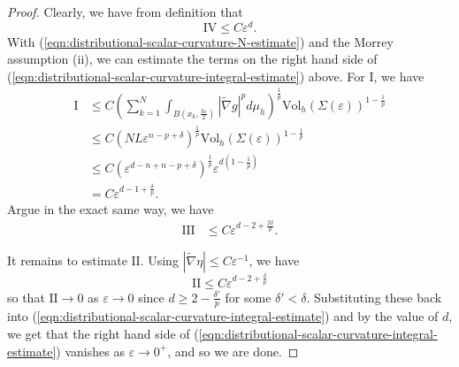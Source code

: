 \documentclass[12pt]{amsart}
\newcommand{\hdel}{\tilde{\nabla}}
\theoremstyle{remark}
\numberwithin{equation}{section}
\def\e{\varepsilon}
\begin{document}
\begin{proof}
Clearly, we have from definition that
 \begin{equation*}
        \text{IV} \leq C\varepsilon^d.
    \end{equation*}
    With (\ref{eqn:distributional-scalar-curvature-N-estimate}) and the Morrey assumption (ii), we can estimate the terms on the right hand side of (\ref{eqn:distributional-scalar-curvature-integral-estimate}) above. For I, we have
    \begin{align*}
        \text{I} &\leq C\left(\sum\limits_{k=1}^N \int_{B(x_k,\frac{3\varepsilon}{2})}|\hdel g|^pd\mu_h\right)^\frac{1}{p}\text{Vol}_h(\Sigma(\varepsilon))^{1-\frac{1}{p}} \nonumber \\
        &\leq C\left(NL\varepsilon^{n-p+\delta}\right)^\frac{1}{p}\text{Vol}_h(\Sigma(\varepsilon))^{1-\frac{1}{p}} \nonumber \\
        &\leq C(\varepsilon^{d-n+n-p+\delta})^\frac{1}{p}\varepsilon^{d\left(1-\frac{1}{p}\right)} \nonumber \\
        &= C\varepsilon^{d-1+\frac{\delta}{p}}.
    \end{align*} 
Argue in the exact same way, we have 
    \begin{align*}
        \text{III} &\leq C\varepsilon^{d-2+\frac{2\delta}{p}}.
    \end{align*}
    
%    

It remains to estimate $\text{II}$. Using $|\hdel \eta|\leq C\e^{-1}$, we have 
\begin{equation}
\text{II}\leq C\e^{d-2+\frac{\delta}{p}}
\end{equation}
so that $\text{II}\to0$ as $\e\to 0$ since $d\geq 2-\frac{\delta'}{p}$ for some $\delta'<\delta$.    Substituting these back into (\ref{eqn:distributional-scalar-curvature-integral-estimate}) and by the value of $d$, we get that the right hand side of (\ref{eqn:distributional-scalar-curvature-integral-estimate}) vanishes as $\varepsilon\to0^+$, and so we are done.
\end{proof}
\end{document}
